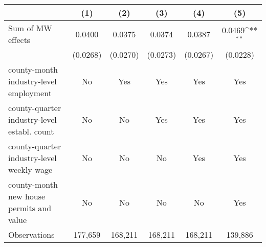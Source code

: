 {
\def\sym#1{\ifmmode^{#1}\else\(^{#1}\)\fi}
\begin{tabular}{l*{5}{c}}
\hline\hline
          &\multicolumn{1}{c}{(1)}         &\multicolumn{1}{c}{(2)}         &\multicolumn{1}{c}{(3)}         &\multicolumn{1}{c}{(4)}         &\multicolumn{1}{c}{(5)}         \\
\hline
Sum of MW effects&   0.0400         &   0.0375         &   0.0374         &   0.0387         &   0.0469\sym{**} \\
          & (0.0268)         & (0.0270)         & (0.0273)         & (0.0267)         & (0.0228)         \\
\hline
county-month industry-level employment&       No         &      Yes         &      Yes         &      Yes         &      Yes         \\
county-quarter industry-level establ. count&       No         &       No         &      Yes         &      Yes         &      Yes         \\
county-quarter industry-level weekly wage&       No         &       No         &       No         &      Yes         &      Yes         \\
county-month new house permits and value&       No         &       No         &       No         &       No         &      Yes         \\
Observations&  177,659         &  168,211         &  168,211         &  168,211         &  139,886         \\
\hline\hline
\end{tabular}
}
